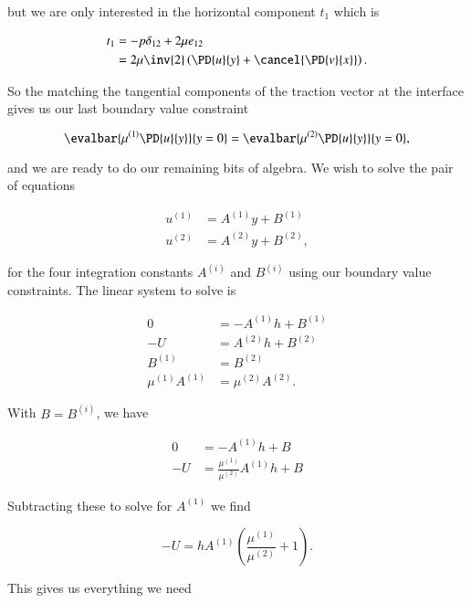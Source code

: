 but we are only interested in the horizontal component $t_1$ which is

\begin{align*}
t_1 
&=
 -p \delta_{12} + 2 \mu e_{12} \\
&=
2 \mu \inv{2} \left( 
\PD{u}{y}
+
\cancel{\PD{v}{x}}
\right).
\end{align*}

So the matching the tangential components of the traction vector at the interface gives us our last boundary value constraint

\begin{equation}\label{eqn:continuumProblemSet2:480}
\evalbar{\mu^{(1)} \PD{u}{y}}{y = 0} = \evalbar{\mu^{(2)} \PD{u}{y}}{y = 0},
\end{equation}

and we are ready to do our remaining bits of algebra.  We wish to solve the pair of equations

\begin{align}\label{eqn:continuumProblemSet2:500}
u^{(1)} &= A^{(1)} y + B^{(1)} \\
u^{(2)} &= A^{(2)} y + B^{(2)},
\end{align}

for the four integration constants $A^{(i)}$ and $B^{(i)}$ using our boundary value constraints.  The linear system to solve is

\begin{align}\label{eqn:continuumProblemSet2:520}
0 &= -A^{(1)} h + B^{(1)} \\
-U &= A^{(2)} h + B^{(2)} \\
B^{(1)} &= B^{(2)} \\
\mu^{(1)} A^{(1)} &= \mu^{(2)} A^{(2)}.
\end{align}

With $B = B^{(i)}$, we have

\begin{align}\label{eqn:continuumProblemSet2:540}
0 &= -A^{(1)} h + B \\
-U &= \frac{\mu^{(1)}}{\mu^{(2)}} A^{(1)} h + B 
\end{align}

Subtracting these to solve for $A^{(1)}$ we find

\begin{equation}\label{eqn:continuumProblemSet2:560}
-U = h A^{(1)} \left( \frac{\mu^{(1)}}{\mu^{(2)}} + 1 \right).
\end{equation}

This gives us everything we need

